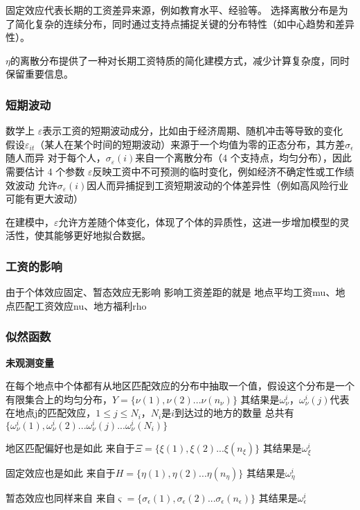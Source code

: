 \documentclass[a4paper,12pt]{article}
\begin{document}
固定效应代表长期的工资差异来源，例如教育水平、经验等。
选择离散分布是为了简化复杂的连续分布，同时通过支持点捕捉关键的分布特性（如中心趋势和差异性）。

$\eta$的离散分布提供了一种对长期工资特质的简化建模方式，减少计算复杂度，同时保留重要信息。

\subsubsection{短期波动}

数学上
$\varepsilon$表示工资的短期波动成分，比如由于经济周期、随机冲击等导致的变化
假设$\varepsilon_{it}$（某人在某个时间的短期波动）来源于一个均值为零的正态分布，其方差$\sigma_{\epsilon}$随人而异
对于每个人，$\sigma_\varepsilon(i)$来自一个离散分布（4 个支持点，均匀分布），因此需要估计 4 个参数
$\varepsilon$反映工资中不可预测的临时变化，例如经济不确定性或工作绩效波动
允许$\sigma_\varepsilon(i)$因人而异捕捉到工资短期波动的个体差异性（例如高风险行业可能有更大波动）


在建模中，$\varepsilon$允许方差随个体变化，体现了个体的异质性，这进一步增加模型的灵活性，使其能够更好地拟合数据。

\subsubsection{工资的影响}

由于个体效应固定、暂态效应无影响
影响工资差距的就是
地点平均工资mu、地点匹配工资效应nu、地方福利rho

\subsubsection{似然函数}

\textbf{未观测变量}

在每个地点中个体都有从地区匹配效应的分布中抽取一个值，假设这个分布是一个有限集合上的均匀分布，$Y=\{\nu(1),\nu(2)...\nu(n_{\nu})\}$
其结果是$\omega^{i}_{\nu}$，$\omega^{i}_{\nu}(j)$代表在地点j的匹配效应，$1\leqslant j\leqslant N_i$，$N_i$是$i$到达过的地方的数量
总共有$\{\omega^{i}_{\nu}(1),\omega^{i}_{\nu}(2)...\omega^{i}_{\nu}(j)...\omega^{i}_{\nu}(N_i)\}$

地区匹配偏好也是如此
来自于$\Xi=\{\xi(1),\xi(2)...\xi(n_{\xi})\}$
其结果是$\omega^{i}_{\xi}$

固定效应也是如此
来自于$H=\{\eta(1),\eta(2)...\eta(n_\eta)\}$
其结果是$\omega^{i}_{\eta}$

暂态效应也同样来自
来自$\varsigma=\{\sigma_{\epsilon}(1),\sigma_{\epsilon}(2)...\sigma_{\epsilon}(n_{\epsilon})\}$
其结果是$\omega^{i}_{\epsilon}$
\end{document}
